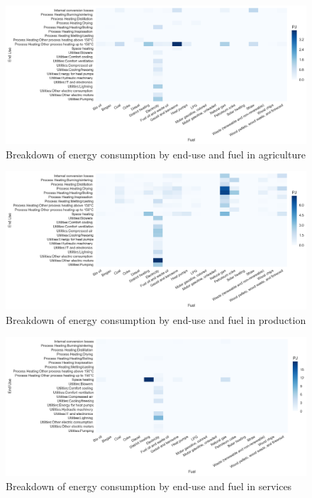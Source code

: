 \documentclass[review]{elsarticle}
\begin{document}
\begin{figure}[H]
\centering
\includegraphics[width=\linewidth]{Img/dan_ind/heatmap_agri.png}
\caption{Breakdown of energy consumption by end-use and fuel in agriculture \cite{VM2015}}
\label{heatmapagri} 
\end{figure}

\begin{figure}[H]
\centering
\includegraphics[width=\linewidth]{Img/dan_ind/heatmap_prod.png}
\caption{Breakdown of energy consumption by end-use and fuel in production \cite{VM2015}}
\label{heatmapprod} 
\end{figure}

\begin{figure}[H]
\centering
\includegraphics[width=\linewidth]{Img/dan_ind/heatmap_serv.png}
\caption{Breakdown of energy consumption by end-use and fuel in services \cite{VM2015}}
\label{heatmapserv} 
\end{figure}
\fi
\end{document}
